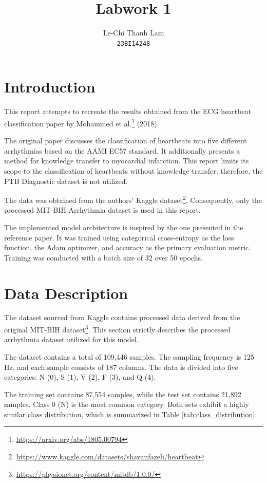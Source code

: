 \documentclass[conference]{IEEEtran}
\title{Labwork 1}
\author{
	Le-Chi Thanh Lam\\
	\texttt{23BI14248}
}
\begin{document}
\maketitle

\section{Introduction}

This report attempts to recreate the results obtained from the ECG heartbeat classification paper by Mohammed et al.\footnote{\url{https://arxiv.org/abs/1805.00794}} (2018).

The original paper discusses the classification of heartbeats into five different arrhythmias based on the AAMI EC57 standard. It additionally presents a method for knowledge transfer to myocardial infarction. This report limits its scope to the classification of heartbeats without knowledge transfer; therefore, the PTB Diagnostic dataset is not utilized. 

The data was obtained from the authors' Kaggle dataset\footnote{\url{https://www.kaggle.com/datasets/shayanfazeli/heartbeat}}. Consequently, only the processed MIT-BIH Arrhythmia dataset is used in this report.

The implemented model architecture is inspired by the one presented in the reference paper. It was trained using categorical cross-entropy as the loss function, the Adam optimizer, and accuracy as the primary evaluation metric. Training was conducted with a batch size of 32 over 50 epochs. 

\section{Data Description}

The dataset sourced from Kaggle contains processed data derived from the original MIT-BIH dataset\footnote{\url{https://physionet.org/content/mitdb/1.0.0/}}. This section strictly describes the processed arrhythmia dataset utilized for this model.

The dataset contains a total of 109,446 samples. The sampling frequency is 125 Hz, and each sample consists of 187 columns. The data is divided into five categories: N (0), S (1), V (2), F (3), and Q (4). 

The training set contains 87,554 samples, while the test set contains 21,892 samples. Class 0 (N) is the most common category. Both sets exhibit a highly similar class distribution, which is summarized in Table \ref{tab:class_distribution}.
\end{document}
